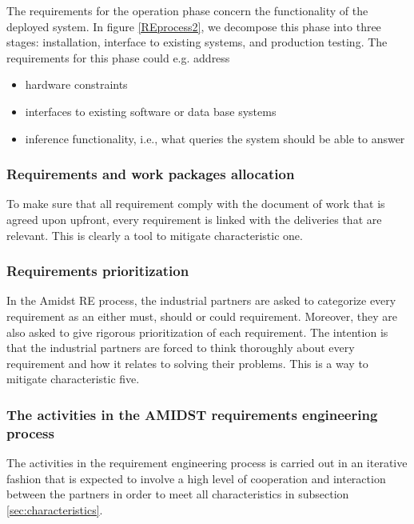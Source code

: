 The requirements for the operation phase concern the functionality of the deployed system. In figure \ref{REprocess2}, we decompose this phase into three stages: installation, interface to existing systems, and production testing. The requirements for this phase could e.g. address
\begin{itemize}
 \item hardware constraints
 \item interfaces to existing software or data base systems
 \item inference functionality, i.e., what queries the system should be able to answer
\end{itemize}

\subsubsection*{Requirements and work packages allocation}

To make sure that all requirement comply with the document of work that is agreed upon upfront, every requirement is linked with the deliveries that are relevant.  This is clearly a tool to mitigate characteristic one.

\subsubsection*{Requirements prioritization}

In the Amidst RE process, the industrial partners are asked to categorize every requirement as an either must, should or could requirement.  Moreover, they are also asked to give rigorous prioritization of each requirement.  The intention is that the industrial partners are forced to think thoroughly about every requirement and how it relates to solving their problems.  This is a way to mitigate characteristic five.

\subsubsection*{The activities in the AMIDST requirements engineering process}
\label{sec:reprocess}

The activities in the requirement engineering process is carried out in an iterative fashion that is expected to involve a high level of cooperation and interaction between the partners in order to meet all characteristics in subsection \ref{sec:characteristics}. 

